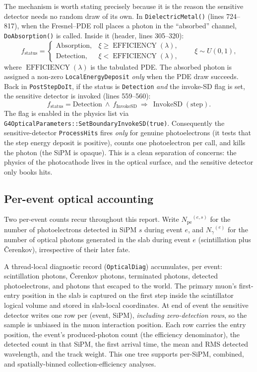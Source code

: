 \documentclass[11pt,a4paper]{article}
\newcommand{\pe}{\ensuremath{N_{\mathrm{pe}}}}
\newcommand{\ngam}{\ensuremath{N_{\gamma}}}
\begin{document}
The mechanism is worth stating precisely because it is the reason the sensitive
detector needs no random draw of its own. In \texttt{DielectricMetal()}
(lines 724--817), when the Fresnel--PDE roll places a photon in the ``absorbed''
channel, \texttt{DoAbsorption()} is called. Inside it (header, lines 305--320):
\begin{equation}
  f_{\mathrm{status}} =
  \begin{cases}
    \mathrm{Absorption}, & \xi \ge \operatorname{EFFICIENCY}(\lambda),\\[2pt]
    \mathrm{Detection},  & \xi <  \operatorname{EFFICIENCY}(\lambda),
  \end{cases}
  \qquad \xi \sim U(0,1),
\end{equation}
where $\operatorname{EFFICIENCY}(\lambda)$ is the tabulated PDE. The absorbed
photon is assigned a non-zero
\texttt{LocalEnergyDeposit} \emph{only} when the PDE draw succeeds. Back in
\texttt{PostStepDoIt}, if the status is \texttt{Detection} \emph{and} the
invoke-SD flag is set, the sensitive detector is invoked (lines 559--560):
\begin{equation}
  f_{\mathrm{status}} = \mathrm{Detection}\ \wedge\ f_{\mathrm{InvokeSD}}
  \ \Longrightarrow\ \operatorname{InvokeSD}(\text{step}).
\end{equation}
The flag is enabled in the physics list via
\texttt{G4OpticalParameters::SetBoundaryInvokeSD(true)}. Consequently the
sensitive-detector \texttt{ProcessHits} fires \emph{only} for genuine
photoelectrons (it tests that the step energy deposit is positive), counts one
photoelectron per call, and kills the photon (the SiPM is opaque). This is a clean
separation of concerns: the physics of the photocathode lives in the optical
surface, and the sensitive detector only books hits.

\subsection{Per-event optical accounting}

Two per-event counts recur throughout this report. Write $\pe^{(e,s)}$ for the
number of photoelectrons detected in SiPM $s$ during event $e$, and
$\ngam^{(e)}$ for the number of optical photons generated in the slab during
event $e$ (scintillation plus \v{C}erenkov), irrespective of their later fate.

A thread-local diagnostic record (\texttt{OpticalDiag}) accumulates, per event:
scintillation photons, \v{C}erenkov photons, terminated photons, detected
photoelectrons, and photons that escaped to the world. The primary muon's
first-entry position in the slab is captured on the first step inside the
scintillator logical volume and stored in slab-local coordinates. At end of
event the sensitive detector writes one row per (event, SiPM), \emph{including
zero-detection rows}, so the sample is unbiased in the muon interaction
position. Each row carries the entry position, the event's produced-photon
count (the efficiency denominator), the detected count in that SiPM, the first
arrival time, the mean and RMS detected wavelength, and the track weight. This
one tree supports per-SiPM, combined, and spatially-binned collection-efficiency
analyses.
\end{document}
